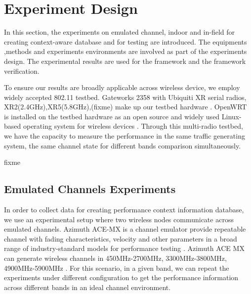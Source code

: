 \section{Experiment Design}
\label{sec:experiment design}

In this section, the experiments on emulated channel, indoor and in-field for creating context-aware database and for testing are introduced. The equipments ,methods and experiments environments are involved as part of the experiments design.
The experimental results are used for the framework and the framework verification. 

To ensure our results are broadly applicable across wireless device, we employ widely accepted 802.11 testbed. Gateworks 2358 with Ubiquiti XR serial radios, XR2(2.4GHz),XR5(5.8GHz),(fixme) make up our testbed hardware \cite{Gateworks,Ubnt}. 
OpenWRT is installed on the testbed hardware as an open source and widely used Linux-based operating system for wireless devices \cite{Openwrt}. Through this multi-radio testbed, we have the capacity to measure the performance in the same traffic generating system, the same channel state for different bands comparison simultaneously.

fixme%

\subsection{Emulated Channels Experiments}
In order to collect data for creating performance context information database, we use an experimental setup where two wireless nodes communicate across emulated channels. Azimuth ACE-MX is a channel emulator provide repeatable channel with fading characteristics, velocity and other parameters in a broad range of industry-standard models for performance testing \cite{AzimuthACE}. 
Azimuth ACE MX can generate wireless channels in 450MHz-2700MHz, 3300MHz-3800MHz, 4900MHz-5900MHz \cite{AzimuthACE}. 
For this scenario, in a given band, we can repeat the experiments under different configuration to get the performance information across different bands in an ideal channel environment.

